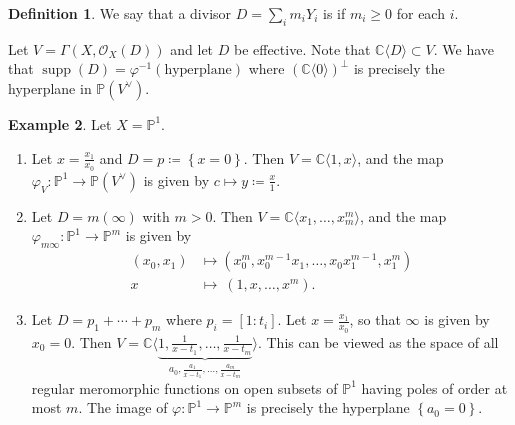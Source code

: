 \documentclass[10pt,letterpaper,cm]{nupset}
\theoremstyle{definition}
\newtheorem{defn}{Definition}[subsection]
\newtheorem{exmp}[defn]{Example}
\theoremstyle{theorem}
\theoremstyle{remark}
\newcommand{\C}{\mathbb C}
\renewcommand{\O}{\mathcal O}
\renewcommand{\P}{\mathbb P}
\newcommand{\1}{\mathbb{1}}
\newcommand{\0}{\vec 0}
\DeclareMathOperator{\supp}{supp}
\newcommand{\be}{\begin{enumerate}}
\newcommand{\ee}{\end{enumerate}}
\begin{document}
\begin{defn}
We say that a divisor $D = \sum_im_iY_i$ is  if $m_i\geq 0$ for each $i$.
\end{defn}

Let $V = \Gamma\left(X, \O_X(D)\right)$ and let $D$ be effective. Note that $\C\langle D \rangle \subset V$. We have that $\supp(D) = \varphi^{-1}\left(\text{hyperplane}\right)$ where $\left(\C \langle 0\rangle \right)^{\perp}$ is precisely the hyperplane in $\P\left(V^{\vee}\right)$.

\begin{exmp} Let $X = \P^1$.
\be
\item Let $x= \frac{x_1}{x_0}$ and $D =p \coloneqq \left\{x=0\right\}$. Then $V = \C\langle 1, x \rangle$, and the map $\varphi_V : \P^1 \to \P\left(V^{\vee}\right)$ is given by $c\mapsto y\coloneqq \frac{x}{1}$.
\item Let $D = m\left(\infty\right)$ with $m>0$. Then $V= \C\langle x_1, \ldots, x_m^m\rangle$, and the map $\varphi_{m{\infty}} : \P^1 \to \P^m$ is given by
\begin{align*}
\left(x_0, x_1\right) & \mapsto \left(x_0^m, x_0^{m-1}x_1, \ldots, x_0x_1^{m-1}, x_1^m\right)
\\ x \ & \mapsto \  \left(1, x, \ldots, x^m\right).
\end{align*}
\item Let $D = p_1 + \cdots + p_m$ where $p_i = \left[1:t_i\right]$. Let $x = \frac{x_1}{x_0}$, so that $\infty$ is given by $x_0 =0$. Then $V = \C\langle \underbrace{1, \frac{1}{x-t_1}, \ldots, \frac{1}{x-t_m}}_{a_0, \frac{a_1}{x-t_1}, \ldots, \frac{a_m}{x-t_m}}\rangle$. This can be viewed as the space of all regular meromorphic functions on open subsets of $\P^1$ having poles of order at most $m$. The image of $\varphi : \P^1 \to \P^m$ is precisely the hyperplane $\left\{a_0 =0\right\}$.
\ee
\end{exmp}
\end{document}
